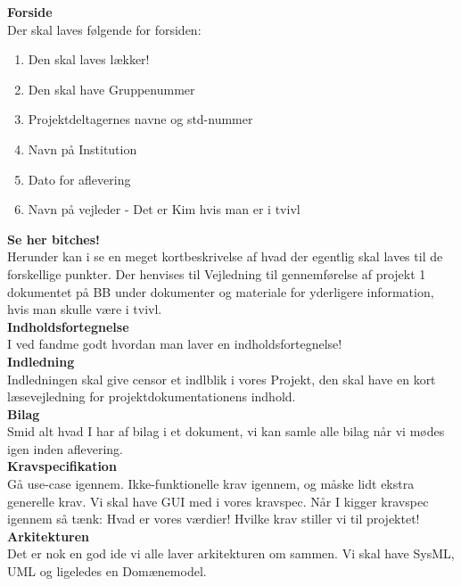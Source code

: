 \documentclass[11pt]{article}
\begin{document}
\textbf{Forside}\\

Der skal laves følgende for forsiden:
\begin{enumerate}
	\item Den skal laves lækker! \checkmark
	\item Den skal have Gruppenummer
	\item Projektdeltagernes navne og std-nummer 
	\item Navn på Institution \checkmark
	\item Dato for aflevering \checkmark
	\item Navn på vejleder - Det er Kim hvis man er i tvivl \checkmark
\end{enumerate}

\textbf{Se her bitches!}\\
\text Herunder kan i se en meget kortbeskrivelse af hvad der egentlig skal laves til de forskellige punkter. Der henvises til Vejledning til gennemførelse af projekt 1 dokumentet på BB under dokumenter og materiale for yderligere information, hvis man skulle være i tvivl.\\

\textbf{Indholdsfortegnelse}
\\
I ved fandme godt hvordan man laver en indholdsfortegnelse!
\\

\textbf{Indledning}
\\
Indledningen skal give censor et indlblik i vores Projekt, den skal have en kort læsevejledning for projektdokumentationens indhold. \\

\textbf{Bilag}\\
Smid alt hvad I har af bilag i et dokument, vi kan samle alle bilag når vi mødes igen inden aflevering.\\

\textbf{Kravspecifikation}\\
Gå use-case igennem. Ikke-funktionelle krav igennem, og måske lidt ekstra generelle krav. Vi skal have GUI med i vores kravspec. Når I kigger kravspec igennem så tænk: Hvad er vores værdier! Hvilke krav stiller vi til projektet!\\

\textbf{Arkitekturen}\\
Det er nok en god ide vi alle laver arkitekturen om sammen. Vi skal have SysML, UML og ligeledes en Domænemodel.\\
\end{document}
